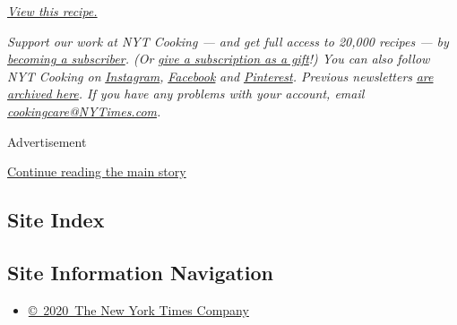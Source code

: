 \emph{\href{https://cooking.nytimes3xbfgragh.onion/recipes/1017937-mississippi-roast}{View
this recipe.}}

\emph{Support our work at NYT Cooking --- and get full access to 20,000
recipes --- by}
\href{https://www.nytimes3xbfgragh.onion/subscription/cooking.html?campaignId=788FJ}{\emph{becoming
a subscriber}}\emph{. (Or}
\href{https://www.nytimes3xbfgragh.onion/subscriptions/Multiproduct/cooking_gift.html?campaignId=78X7R}{\emph{give
a subscription as a gift}}\emph{!) You can also follow NYT Cooking on}
\href{https://www.instagram.com/nytcooking}{\emph{Instagram}}\emph{,}
\href{https://www.facebookcorewwwi.onion/nytcooking/}{\emph{Facebook}}
\emph{and}
\href{https://www.pinterest.com/nytcooking/}{\emph{Pinterest}}\emph{.
Previous newsletters}
\href{https://www.nytimes3xbfgragh.onion/column/five-weeknight-dishes}{\emph{are
archived here}}\emph{. If you have any problems with your account,
email}
\href{mailto:cookingcare@NYTimes.com}{\emph{cookingcare@NYTimes.com}}\emph{.}

Advertisement

\protect\hyperlink{after-bottom}{Continue reading the main story}

\hypertarget{site-index}{%
\subsection{Site Index}\label{site-index}}

\hypertarget{site-information-navigation}{%
\subsection{Site Information
Navigation}\label{site-information-navigation}}

\begin{itemize}
\tightlist
\item
  \href{https://help.nytimes3xbfgragh.onion/hc/en-us/articles/115014792127-Copyright-notice}{©~2020~The
  New York Times Company}
\end{itemize}

